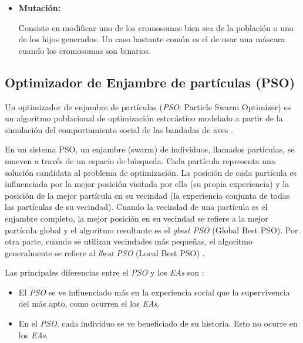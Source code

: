 \begin{itemize}
\begin{itemize}
[1 3 3 6 6] y [5 1 2 6 2]

De esta misma forma se puede extender para m\'as puntos.

\end{itemize}

\item {\bf Mutaci\'on:}

Consiste en modificar uno de los cromosomas bien sea de la poblaci\'on
o uno de los hijos generados. Un caso bastante com\'un es el de usar una m\'ascara
cuando los cromosomas son binarios.

\end{itemize}

\subsection{Optimizador de Enjambre de partículas (PSO)}

    Un optimizador de enjambre de partículas (\emph{PSO}: Particle Swarm Optimizer)
es un algoritmo poblacional de optimización estocástico modelado a partir de la
simulación del comportamiento social de las bandadas de aves \cite{PSO_1}
\cite{PSO_2}.

    En un sistema PSO, un enjambre (swarm) de individuos, llamados partículas, se
mueven a través de un espacio de búsqueda. Cada partícula representa una
solución candidata al problema de optimización. La posición de  cada partícula
es influenciada por la mejor posición visitada por ella (su propia experiencia)
y la posición de la mejor partícula en su vecindad (la experiencia conjunta de
todas las partículas de su vecindad). Cuando la vecindad de una partícula es
el enjambre completo, la mejor posición en su vecindad se refiere a la mejor
partícula global y el algoritmo resultante es el \emph{gbest PSO} (Global Best
PSO). Por otra parte, cuando se utilizan vecindades más pequeñas, el algoritmo
generalmente se refiere al \emph{lbest PSO} (Local Best PSO) \cite{PSO_0}.

    Las principales diferencias entre el \emph{PSO} y los \emph{EAs} son
\cite{PSO_0}:
\begin{itemize}
    \item El \emph{PSO} se ve influenciado más en la experiencia social que la
supervivencia del más apto, como ocurren el los \emph{EAs}.
    \item En el \emph{PSO}, cada individuo se ve beneficiado de su historia. Esto
no ocurre en los \emph{EAs}.
\end{itemize}

